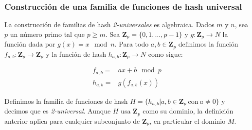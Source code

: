 \documentclass[a4paper,12pt, oneside]{article}
\begin{document}
\subsubsection{Construcción de una familia de funciones de hash universal}
La construcción de familias de hash \textit{2-universales} es algebraica. Dados $m$ y $n$, sea $p$ un número primo tal que $p \geq m$. Sea $\mathbf{Z}_p = \{ 0, 1, \dots, p-1\}$ y $g: \mathbf{Z}_p \rightarrow N$ la función dada por $g(x) = x \mod n$. Para todo $a,b \in \mathbf{Z}_p$ definimos la función $f_{a,b}: \mathbf{Z}_p \rightarrow \mathbf{Z}_p$ y la función de hash $h_{a,b}: \mathbf{Z}_p \rightarrow N$ como sigue:

\begin{equation}
	\begin{array}{ll}
		f_{a,b} = & ax + b \mod p \\
		h_{a,b} = & g(f_{a,b}(x))
	\end{array}
\end{equation}

Definimos la familia de funciones de hash $H = \{ h_{a,b} | a,b \in \mathbf{Z}_p \ \text{con} \ a \neq 0 \}$ y decimos que es \textit{2-universal}. Aunque $H$ usa $\mathbf{Z}_p$ como su dominio, la definición anterior aplica para cualquier subconjunto de $\mathbf{Z}_p$, en particular el dominio $M$.
\end{document}
